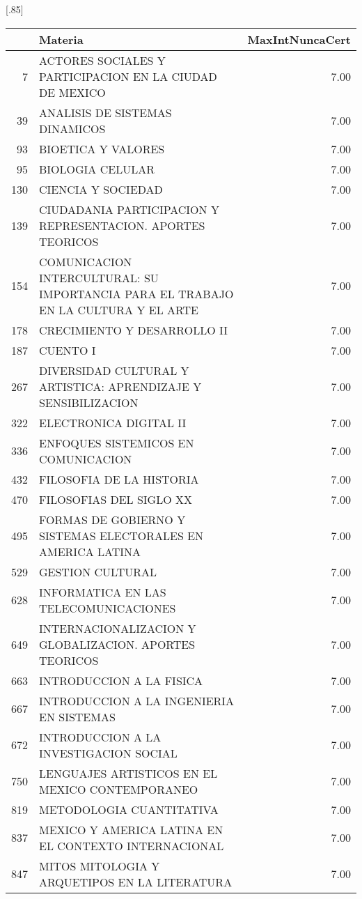 \documentclass[12pt]{article}
\begin{document}
\begin{table}[ht]
\centering
\scalebox{0.75}[.85]{
\begin{tabular}{rlr}
  \hline
 & Materia & MaxIntNuncaCert \\ 
  \hline
    7 & ACTORES SOCIALES Y PARTICIPACION EN LA CIUDAD DE MEXICO & 7.00 \\ 
  39 & ANALISIS DE SISTEMAS DINAMICOS & 7.00 \\ 
  93 & BIOETICA Y VALORES & 7.00 \\ 
  95 & BIOLOGIA CELULAR & 7.00 \\ 
  130 & CIENCIA Y SOCIEDAD & 7.00 \\ 
  139 & CIUDADANIA PARTICIPACION Y REPRESENTACION. APORTES TEORICOS & 7.00 \\ 
  154 & COMUNICACION INTERCULTURAL: SU IMPORTANCIA PARA EL TRABAJO EN LA CULTURA Y EL ARTE & 7.00 \\ 
  178 & CRECIMIENTO Y DESARROLLO II & 7.00 \\ 
  187 & CUENTO I & 7.00 \\ 
  267 & DIVERSIDAD CULTURAL Y ARTISTICA: APRENDIZAJE Y SENSIBILIZACION & 7.00 \\ 
  322 & ELECTRONICA DIGITAL II & 7.00 \\ 
  336 & ENFOQUES SISTEMICOS EN COMUNICACION & 7.00 \\ 
  432 & FILOSOFIA DE LA HISTORIA & 7.00 \\ 
  470 & FILOSOFIAS DEL SIGLO XX & 7.00 \\ 
  495 & FORMAS DE GOBIERNO Y SISTEMAS ELECTORALES EN AMERICA LATINA & 7.00 \\ 
  529 & GESTION CULTURAL & 7.00 \\ 
  628 & INFORMATICA EN LAS TELECOMUNICACIONES & 7.00 \\ 
  649 & INTERNACIONALIZACION Y GLOBALIZACION. APORTES TEORICOS & 7.00 \\ 
  663 & INTRODUCCION A LA FISICA & 7.00 \\ 
  667 & INTRODUCCION A LA INGENIERIA EN SISTEMAS & 7.00 \\ 
  672 & INTRODUCCION A LA INVESTIGACION SOCIAL & 7.00 \\ 
  750 & LENGUAJES ARTISTICOS EN EL MEXICO CONTEMPORANEO & 7.00 \\ 
  819 & METODOLOGIA CUANTITATIVA & 7.00 \\ 
  837 & MEXICO Y AMERICA LATINA EN EL CONTEXTO INTERNACIONAL & 7.00 \\ 
  847 & MITOS MITOLOGIA Y ARQUETIPOS EN LA LITERATURA & 7.00 \\ 

\end{tabular}}
\end{table}
\end{document}

